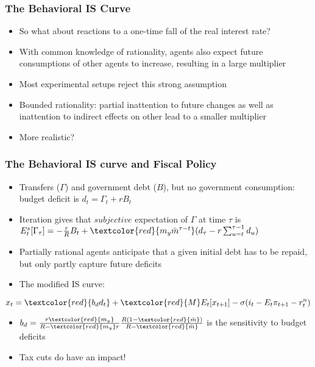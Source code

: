 \documentclass{beamer}
\begin{document}

\begin{frame}
\frametitle{The Behavioral IS Curve}
\begin{itemize}
\item So what about reactions to a one-time fall of the real interest rate?
\item With common knowledge of rationality, agents also expect future consumptions of other agents to increase, resulting in a large multiplier
\item Most experimental setups reject this strong assumption
\item Bounded rationality: partial inattention to future changes as well as inattention to indirect effects on other lead to a smaller multiplier
\item More realistic?
\end{itemize}
\end{frame}


\begin{frame}
\frametitle{The Behavioral IS curve and Fiscal Policy}
\begin{itemize}
\item Transfers ($\Gamma$) and government debt ($B$), but no government consumption: budget deficit is $d_ {t}=\Gamma_{t}+rB_{t}$
\item Iteration gives that $subjective$ expectation of $\Gamma$ at time $\tau$ is $E_{t}^{s}[\Gamma_{\tau}]=-\frac {r}{R}B_{t}+\textcolor{red}{m_{y}\bar m^{\tau-t}}(d_{\tau}-r \sum_{u=t}^{\tau-1}d_{u})$
\item Partially rational agents anticipate that a given initial debt has to be repaid, but only partly capture future deficits
\item The modified IS curve:

\end{itemize}
	$$x_{t}=\textcolor{red}{b_{d}d_{t}}+\textcolor{red}{M}E_{t}[x_{t+1}]-\sigma(i_{t}-E_{t}\pi_{t+1}-r_{t}^{n})$$
\begin{itemize}
 \item $b_{d}=\frac {r\textcolor{red}{m_{y}}}{R-\textcolor{red}{m_{y}}r}\frac {R(1-\textcolor{red}{\bar m})}{R-\textcolor{red}{\bar m}}$ is the sensitivity to budget deficits
 \item Tax cuts do have an impact!
\end{itemize}
\end{frame}
\end{document}
